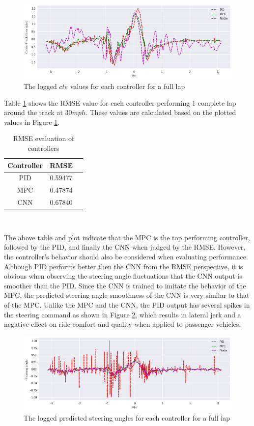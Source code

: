 \begin{figure}[htbp]
\centerline{\includegraphics[width=\linewidth]{plots/cte.png}}
\caption{The logged \(cte\) values for each controller for a full lap}
\label{cte_plot}
\end{figure}
Table \ref{table:1} shows the RMSE value for each controller performing 1 complete lap around the track at \(30 mph\). These values are calculated based on the plotted values in Figure \ref{cte_plot}.
\begin{table}[ht]
\centering
\begin{tabular}{ |c|c|c| } 
\hline
Controller & RMSE \\
\hline
PID & 0.59477 \\ 
MPC & 0.47874 \\ 
CNN & 0.67840 \\ 
\hline 
\end{tabular}\\
\caption{RMSE evaluation of controllers}
\label{table:1}
\end{table}

The above table and plot indicate that the MPC is the top performing controller, followed by the PID, and finally the CNN when judged by the RMSE. However, the controller's behavior should also be considered when evaluating performance. Although PID performs better then the CNN from the RMSE perspective, it is obvious when observing the steering angle fluctuations that the CNN output is smoother than the PID. Since the CNN is trained to imitate the behavior of the MPC, the predicted steering angle smoothness of the CNN is very similar to that of the MPC. Unlike the MPC and the CNN, the PID output has several spikes in the steering command as shown in Figure \ref{steer}, which results in lateral jerk and a negative effect on ride comfort and quality when applied to passenger vehicles.\\
\begin{figure}[htbp]
\centerline{\includegraphics[width=\linewidth]{plots/steer.png}}
\caption{The logged predicted steering angles for each controller for a full lap}
\label{steer}
\end{figure}


